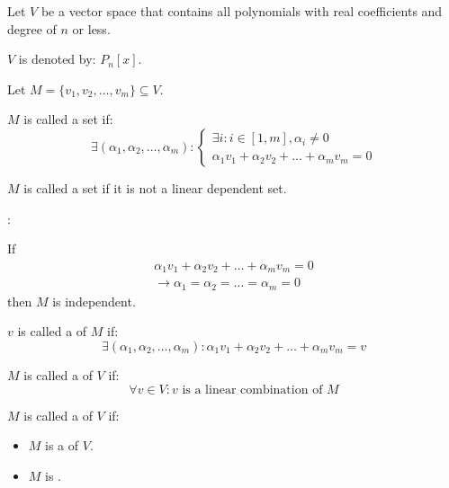      \par Let $V$ be a vector space that contains all polynomials with real
      coefficients and degree of $n$ or less.
      \par $V$ is denoted by: $P_{n}[x]$.


  \par Let $M = \{v_{1}, v_{2}, \ldots, v_{m}\} \subseteq V$.


      \par $M$ is called a  set if:
      \[
        \exists (\alpha_{1}, \alpha_{2}, \ldots, \alpha_{m}):
        \begin{cases}
          \exists i: i \in [1, m], \alpha_{i} \neq 0 \\
          \alpha_{1} v_{1} + \alpha_{2} v_{2}
            + \ldots + \alpha_{m} v_{m} = 0
        \end{cases}
      \]

      \par $M$ is called a  set if it is
      not a linear dependent set.
      \par {}:
      \par If
      \begin{align*}
          \alpha_{1} v_{1} + \alpha_{2} v_{2}
            + \ldots + \alpha_{m} v_{m} = 0 \\
          \rightarrow \alpha_{1} = \alpha_{2}
            = \ldots = \alpha_{m} = 0
      \end{align*}
      then $M$ is independent.

       \par $v$ is called a  of $M$ if:
      \[
        \exists (\alpha_{1}, \alpha_{2}, \ldots, \alpha_{m}):
          \alpha_{1} v_{1} + \alpha_{2} v_{2}
            + \ldots + \alpha_{m} v_{m} = v
      \]

    \par $M$ is called a  of $V$ if:
    \[
      \forall v \in V: v \mbox{ is a linear combination of } M
    \]

    \par $M$ is called a  of $V$ if:
    \begin{itemize}
      \item $M$ is a  of $V$.
      \item $M$ is .
    \end{itemize}

